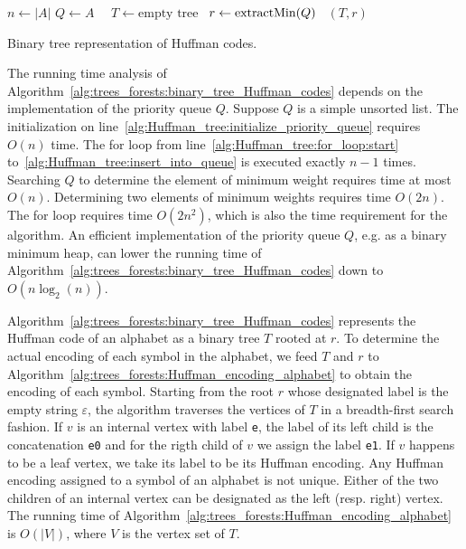 \begin{algorithm}[!htpb]
\dontprintsemicolon  %
\BlankLine
$n \leftarrow |A|$\;
$Q \leftarrow A$~~\;
$T \leftarrow \text{empty tree}$~\;
$r \leftarrow \operatorname*{extractMin}(Q)$~\;
\Return $(T, r)$~\;
\caption{Binary tree representation of Huffman codes.}
\label{alg:trees_forests:binary_tree_Huffman_codes}
\end{algorithm}

The running time analysis of
Algorithm~\ref{alg:trees_forests:binary_tree_Huffman_codes} depends on
the implementation of the priority queue $Q$. Suppose $Q$ is a simple
unsorted list. The initialization on
line~\ref{alg:Huffman_tree:initialize_priority_queue} requires $O(n)$
time. The for loop from line~\ref{alg:Huffman_tree:for_loop:start}
to~\ref{alg:Huffman_tree:insert_into_queue} is executed exactly
$n - 1$ times. Searching $Q$ to determine the element of minimum
weight requires time at most $O(n)$. Determining two elements of
minimum weights requires time $O(2n)$. The for loop requires time
$O(2n^2)$, which is also the time requirement for the algorithm. An
efficient implementation of the priority queue $Q$, e.g. as a binary
minimum heap, can lower the running time of
Algorithm~\ref{alg:trees_forests:binary_tree_Huffman_codes} down to
$O(n \log_2(n))$.

Algorithm~\ref{alg:trees_forests:binary_tree_Huffman_codes} represents
the Huffman code of an alphabet as a binary tree $T$ rooted at $r$. To
determine the actual encoding of each symbol in the alphabet, we feed
$T$ and $r$ to
Algorithm~\ref{alg:trees_forests:Huffman_encoding_alphabet} to obtain
the encoding of each symbol. Starting from the root $r$ whose
designated label is the empty string $\varepsilon$, the algorithm
traverses the vertices of $T$ in a breadth-first search fashion. If
$v$ is an internal vertex with label \verb!e!, the label of its left
child is the concatenation \verb!e0! and for the rigth child of $v$ we
assign the label \verb!e1!. If $v$ happens to be a leaf vertex, we
take its label to be its Huffman encoding. Any Huffman encoding
assigned to a symbol of an alphabet is not unique. Either of the two
children of an internal vertex can be designated as the left
(resp. right) vertex. The running time of
Algorithm~\ref{alg:trees_forests:Huffman_encoding_alphabet} is
$O(|V|)$, where $V$ is the vertex set of $T$.

